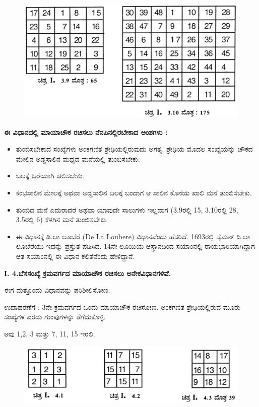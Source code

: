 \begin{itemize}
\begin{figure}[h]
	\includegraphics{src/figures/chap3/fig3.8.jpg}
	\end{figure}
\end{itemize}

\noindent \textbf{ಈ ವಿಧಾನದಲ್ಲಿ ಮಾಯಾಚೌಕ ರಚಿಸಲು ನೆನಪಿನಲ್ಲಿರಬೇಕಾದ ಅಂಶಗಳು :}
\begin{itemize}
	\item ತುಂಬಿಸಬೇಕಾದ ಸಂಖ್ಯೆಗಳು ಅಂಕಗಣಿತ ಶ್ರೇಢಿಯಲ್ಲಿರುವುದು ಅಗತ್ಯ. ಶ್ರೇಢಿಯ ಮೊದಲ ಸಂಖ್ಯೆಯನ್ನು ಚೌಕದ ಮೇಲಿನ ಅಡ್ಡಸಾಲಿನ ಮಧ್ಯದ ಮನೆಯಲ್ಲಿ ತುಂಬಿಸಬೇಕು.
	\item ಬಲಕ್ಕೆ ಓರೆಯಾಗಿ ಚಲಿಸಬೇಕು.
	\item ಕಂಭಸಾಲಿನ ಮೇಲಕ್ಕೆ ಅಥವಾ ಅಡ್ಡಸಾಲಿನ ಬಲಕ್ಕೆ ಬಂದಾಗ ಆ ಸಾಲಿನ ಕೊನೆಯ ಖಾಲಿ ಮನೆ ತುಂಬಿಸಬೇಕು.
	\item ತುಂಬಿದ ಮನೆ ಎದುರಾದರೆ ಅಥವಾ ಯಾವುದೇ ಸಾಲುಗಳು ಇಲ್ಲದಾಗ (3.9ರಲ್ಲಿ 15, 3.10ರಲ್ಲಿ 28, 3.5ರಲ್ಲಿ 6) ಕೆಳಗಿನ ಮನೆ ತುಂಬಿಸಬೇಕು.
	\item ಈ ವಿಧಾನಕ್ಕೆ ಡಿ.ಲಾ ಲೂಬೆರೆ (De La Loubere) ವಿಧಾನವೆಂದು ಹೆಸರಿದೆ. 1693ರಲ್ಲಿ ಸೈಮನ್ ಡಿ.ಲಾ ಲೂಬೆರೆಯು ಇದನ್ನು ಪ್ರಸ್ತುತ ಪಡಿಸಿದ. 14ನೇ ಲೂಯಿಯ ಆಸ್ಥಾನದಿಂದ ಸಯಾಂನಲ್ಲಿ ರಾಯಭಾರಿಯಾಗಿದ್ದಾಗ ಆತ ಸಯಾಂನಲ್ಲಿ ಈ ವಿಧಾನ ಕಲಿತೆನೆಂದು ಹೇಳಿದ್ದಾನೆ.
\end{itemize}

\noindent \textbf{I. 4.ಬೆಸಸಂಖ್ಯೆ ಕ್ರಮವರ್ಗದ ಮಾಯಾಚೌಕ ರಚಿಸಲು ಅನೇಕವಿಧಾನಗಳಿವೆ.}

ಈಗ ಮತ್ತೊಂದು ವಿಧಾನವನ್ನು ಪರಿಶೀಲಿಸೋಣ.

ಉದಾಹರಣೆಗೆ : 3ನೇ ಕ್ರಮವರ್ಗದ ಒಂದು ಮಾಯಾಚೌಕ ರಚಿಸೋಣ. ಅಂಕಗಣಿತ ಶ್ರೇಢಿಯಲ್ಲಿರುವ ಮೂರು ಸಂಖ್ಯೆಗಳ ಎರಡು ಗುಂಪುಗಳನ್ನು ತೆಗೆದುಕೊಳ್ಳಿ.

ಅವು 1,2, 3 ಮತ್ತು 7, 11, 15 ಇರಲಿ.
\begin{figure}[h]
\includegraphics{src/figures/chap3/fig3.9.jpg}
\end{figure}

